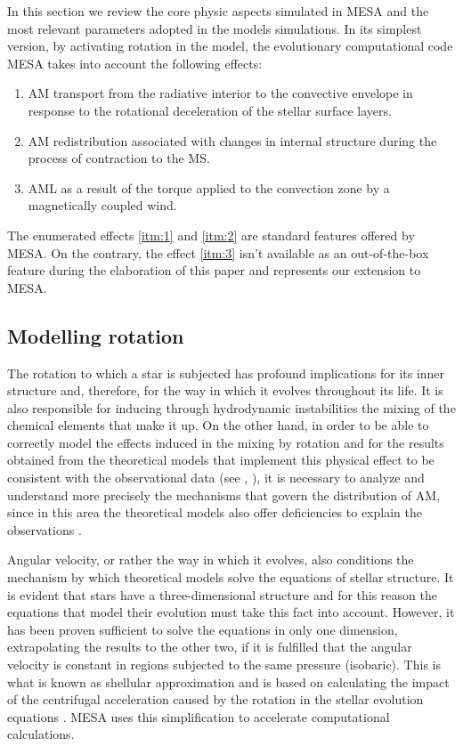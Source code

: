 \documentclass[fleqn,usenatbib]{mnras}
\begin{document}
In this section we review the core physic aspects simulated in MESA and the most relevant parameters adopted in the models simulations. In its simplest version, by activating rotation in the model, the evolutionary computational code MESA takes into account the following effects:
\begin{enumerate}
    \item AM transport from the radiative interior to the convective envelope in response to the rotational deceleration of the stellar surface layers\label{itm:1}.
    \item AM redistribution associated with changes in internal structure during the process of contraction to the MS\label{itm:2}.
    \item AML as a result of the torque applied to the convection zone by a magnetically coupled wind\label{itm:3}.
\end{enumerate}

The enumerated effects \ref{itm:1} and \ref{itm:2} are standard features offered by MESA. On the contrary, the effect \ref{itm:3} isn't available as an out-of-the-box feature during the elaboration of this paper and represents our extension to MESA.

\subsection{Modelling rotation}
The rotation to which a star is subjected has profound implications for its inner structure and, therefore, for the way in which it evolves throughout its life. It is also responsible for inducing through hydrodynamic instabilities the mixing of the chemical elements that make it up. On the other hand, in order to be able to correctly model the effects induced in the mixing by rotation and for the results obtained from the theoretical models that implement this physical effect to be consistent with the observational data (see \citet{Pinsonneault1997}, \citet{Maeder2000}), it is necessary to analyze and understand more precisely the mechanisms that govern the distribution of AM, since in this area the theoretical models also offer deficiencies to explain the observations \citep{Denissenkov2007}. \par

Angular velocity, or rather the way in which it evolves, also conditions the mechanism by which theoretical models solve the equations of stellar structure. It is evident that stars have a three-dimensional structure and for this reason the equations that model their evolution must take this fact into account. However, it has been proven sufficient to solve the equations in only one dimension, extrapolating the results to the other two, if it is fulfilled that the angular velocity is constant in regions subjected to the same pressure (isobaric). This is what is known as shellular approximation \citep{Meynet1997} and is based on calculating the impact of the centrifugal acceleration caused by the rotation in the stellar evolution equations \citep{Endal1976}. MESA uses this simplification to accelerate computational calculations.\par
\end{document}
